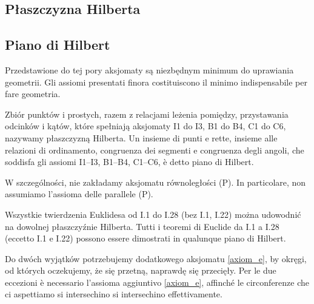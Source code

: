 




\subsection{Płaszczyzna Hilberta} %
\subsection{Piano di Hilbert} %

Przedstawione do tej pory aksjomaty są niezbędnym minimum do uprawiania geometrii. %
Gli assiomi presentati finora costituiscono il minimo indispensabile per fare geometria. %

\begin{definition}
    Zbiór punktów i prostych, razem z relacjami leżenia pomiędzy, przystawania odcinków i kątów, które spełniają aksjomaty I1 do I3, B1 do B4, C1 do C6, nazywamy płaszczyzną Hilberta. %
    Un insieme di punti e rette, insieme alle relazioni di ordinamento, congruenza dei segmenti e congruenza degli angoli, che soddisfa gli assiomi I1--I3, B1--B4, C1--C6, è detto piano di Hilbert. %
\end{definition}

W szczególności, nie zakładamy aksjomatu równoległości (P). %
In particolare, non assumiamo l'assioma delle parallele (P). %


Wszystkie twierdzenia Euklidesa od I.1 do I.28 (bez I.1, I.22) można udowodnić na dowolnej płaszczyźnie Hilberta. %
Tutti i teoremi di Euclide da I.1 a I.28 (eccetto I.1 e I.22) possono essere dimostrati in qualunque piano di Hilbert. %

Do dwóch wyjątków potrzebujemy dodatkowego aksjomatu \ref{axiom_e}, by okręgi, od których oczekujemy, że się przetną, naprawdę się przecięły. %
Per le due eccezioni è necessario l'assioma aggiuntivo \ref{axiom_e}, affinché le circonferenze che ci aspettiamo si intersechino si intersechino effettivamente. %


